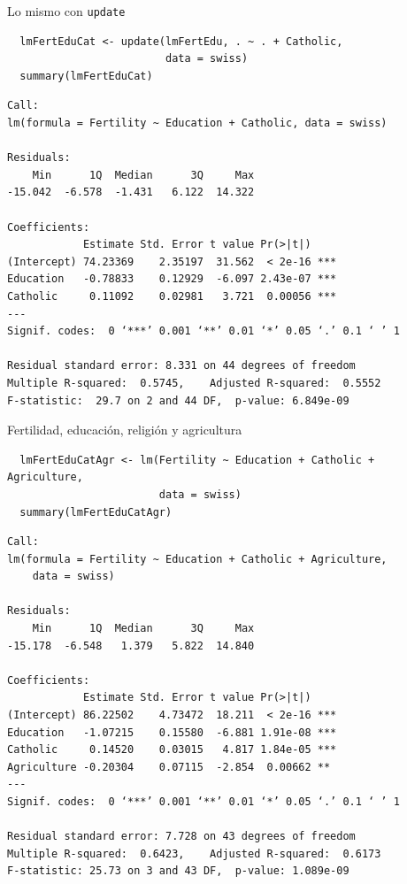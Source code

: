 \documentclass[xcolor={usenames,svgnames,dvipsnames}]{beamer}
\begin{document}
\begin{frame}[fragile,label=sec-3-4]{Lo mismo con \texttt{update}}
 \lstset{language=R,label= ,caption= ,numbers=none}
\begin{lstlisting}
  lmFertEduCat <- update(lmFertEdu, . ~ . + Catholic,
                         data = swiss)
  summary(lmFertEduCat)
\end{lstlisting}

\begin{verbatim}
Call:
lm(formula = Fertility ~ Education + Catholic, data = swiss)

Residuals:
    Min      1Q  Median      3Q     Max 
-15.042  -6.578  -1.431   6.122  14.322 

Coefficients:
            Estimate Std. Error t value Pr(>|t|)    
(Intercept) 74.23369    2.35197  31.562  < 2e-16 ***
Education   -0.78833    0.12929  -6.097 2.43e-07 ***
Catholic     0.11092    0.02981   3.721  0.00056 ***
---
Signif. codes:  0 ‘***’ 0.001 ‘**’ 0.01 ‘*’ 0.05 ‘.’ 0.1 ‘ ’ 1

Residual standard error: 8.331 on 44 degrees of freedom
Multiple R-squared:  0.5745,	Adjusted R-squared:  0.5552 
F-statistic:  29.7 on 2 and 44 DF,  p-value: 6.849e-09
\end{verbatim}
\end{frame}


\begin{frame}[fragile,label=sec-3-5]{Fertilidad, educación, religión y agricultura}
 \lstset{language=R,label= ,caption= ,numbers=none}
\begin{lstlisting}
  lmFertEduCatAgr <- lm(Fertility ~ Education + Catholic + Agriculture,
                        data = swiss)
  summary(lmFertEduCatAgr)
\end{lstlisting}

\begin{verbatim}
Call:
lm(formula = Fertility ~ Education + Catholic + Agriculture, 
    data = swiss)

Residuals:
    Min      1Q  Median      3Q     Max 
-15.178  -6.548   1.379   5.822  14.840 

Coefficients:
            Estimate Std. Error t value Pr(>|t|)    
(Intercept) 86.22502    4.73472  18.211  < 2e-16 ***
Education   -1.07215    0.15580  -6.881 1.91e-08 ***
Catholic     0.14520    0.03015   4.817 1.84e-05 ***
Agriculture -0.20304    0.07115  -2.854  0.00662 ** 
---
Signif. codes:  0 ‘***’ 0.001 ‘**’ 0.01 ‘*’ 0.05 ‘.’ 0.1 ‘ ’ 1

Residual standard error: 7.728 on 43 degrees of freedom
Multiple R-squared:  0.6423,	Adjusted R-squared:  0.6173 
F-statistic: 25.73 on 3 and 43 DF,  p-value: 1.089e-09
\end{verbatim}
\end{frame}
\end{document}
